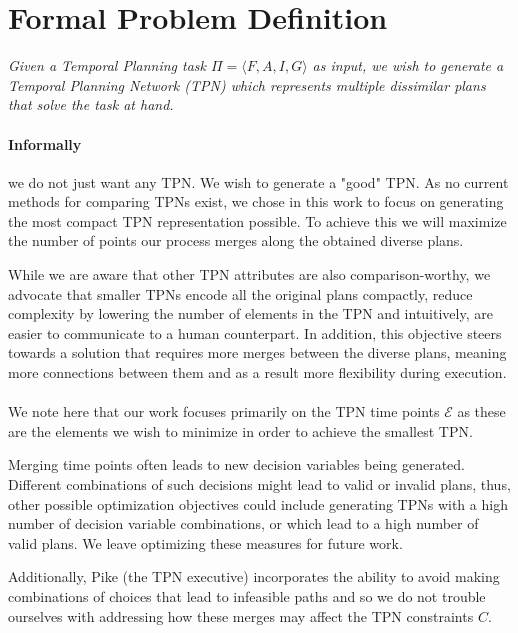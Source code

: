 \section{Formal Problem Definition}
\label{generating: formal prob def}


\begin{tcolorbox}[colback=gray!5!white,colframe=gray!75!black]
\textit{Given a Temporal Planning task $\Pi = \langle F,A,I,G \rangle $ as input, we wish to generate a Temporal Planning Network (TPN) which represents multiple dissimilar plans that solve the task at hand.}
\end{tcolorbox}


\paragraph{Informally} we do not just want any TPN. We wish to generate a "good" TPN. 
As no current methods for comparing TPNs exist, we chose in this work to focus on generating 
the most compact TPN representation possible. To achieve this we will maximize the number of 
points our process merges along the obtained diverse plans.

While we are aware that other TPN attributes are also comparison-worthy, we advocate that smaller TPNs encode all the original plans compactly, reduce complexity by lowering the number of elements in the TPN and intuitively, are easier to communicate to a human counterpart. In addition, this objective steers towards a solution that requires more merges between the diverse plans, meaning more connections between them and as a result more flexibility during execution.

\paragraph{}
We note here that our work focuses primarily on the TPN time points $\mathcal{E}$ as these are the elements we wish to minimize in order to achieve the smallest TPN.

Merging time points often leads to new decision variables being generated. Different combinations of such decisions might lead to valid or invalid plans, thus, other possible optimization objectives could include generating TPNs with a high number of decision variable combinations, or which lead to a high number of valid plans. We leave optimizing these measures for future work.

Additionally, Pike (the TPN executive) incorporates the ability to avoid making combinations of choices that lead to infeasible paths and so we do not trouble ourselves with addressing how these merges may affect the TPN constraints $C$.